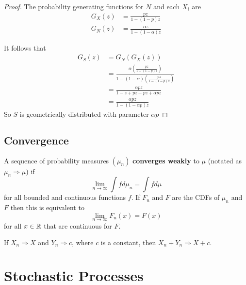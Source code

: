 \begin{proof}
The probability generating functions for $N$ and each $X_i$ are
\begin{align*}
    G_X(z) &= \frac{p z}{1 - (1 - p)z}\\
    G_{N}(z) &= \frac{\alpha z}{1 - (1 - \alpha)z}
\end{align*}

It follows that
\begin{align*}
    G_S(z) &= G_N(G_X(z))\\
    &= \frac{
    \alpha \left( \frac{p z}{1 - (1 - p)z} \right)
    }{
        1 - (1 - \alpha) \left( \frac{p z}{1 - (1 - p)z} \right)
    }\\
    &= \frac{
        \alpha p z
    }{
        1 - z + pz - pz + \alpha p z
    } \\
    &= \frac{
        \alpha p z
    }{
        1 - (1 - \alpha p) z
    }
\end{align*}
So $S$ is geometrically distributed with parameter $\alpha p$
\end{proof}

\subsection{Convergence}

\begin{defn}
A sequence of probability measures $(\mu_n)$ \textbf{converges weakly} to $\mu$ (notated as $\mu_n \Rightarrow \mu$) if
$$
\lim_{n \to \infty} \int f d\mu_n = \int f d\mu
$$
for all bounded and continuous functions $f$.
If $F_n$ and $F$ are the CDFs of $\mu_n$ and $F$ then this is equivalent to
$$
\lim_{n \to \infty} F_n(x) = F(x)
$$
for all $x \in \mathbb{R}$ that are continuous for $F$.
\end{defn}


\begin{theorem} \label{thm:conv_together_lemma}
If $X_n \Rightarrow X$ and $Y_n \Rightarrow c$, where $c$ is a constant, then $X_n + Y_n \Rightarrow X + c$.
\end{theorem}

\section{Stochastic Processes}

